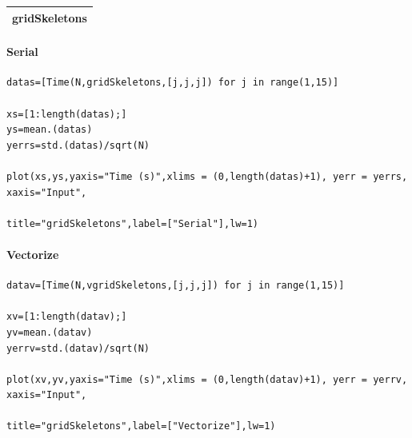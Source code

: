 \documentclass{article}
\begin{document}
\begin{tabular}{p{16cm}}
\hline
gridSkeletons\\
\hline
\end{tabular}

\paragraph{Serial}
\begin{flushleft}\small
\begin{list}{}{} \item
    \begin{Verbatim}[tabsize=4]
datas=[Time(N,gridSkeletons,[j,j,j]) for j in range(1,15)]

xs=[1:length(datas);]
ys=mean.(datas)
yerrs=std.(datas)/sqrt(N)

plot(xs,ys,yaxis="Time (s)",xlims = (0,length(datas)+1), yerr = yerrs, xaxis="Input", 
                                                title="gridSkeletons",label=["Serial"],lw=1)
 \end{Verbatim}
\end{list}
\end{flushleft} 

\paragraph{Vectorize}
\begin{flushleft}\small
\begin{list}{}{} \item
    \begin{Verbatim}[tabsize=4]
datav=[Time(N,vgridSkeletons,[j,j,j]) for j in range(1,15)]

xv=[1:length(datav);]
yv=mean.(datav)
yerrv=std.(datav)/sqrt(N)

plot(xv,yv,yaxis="Time (s)",xlims = (0,length(datav)+1), yerr = yerrv, xaxis="Input", 
                                            title="gridSkeletons",label=["Vectorize"],lw=1)
    \end{Verbatim}
\end{list}
\end{flushleft}
\end{document}
